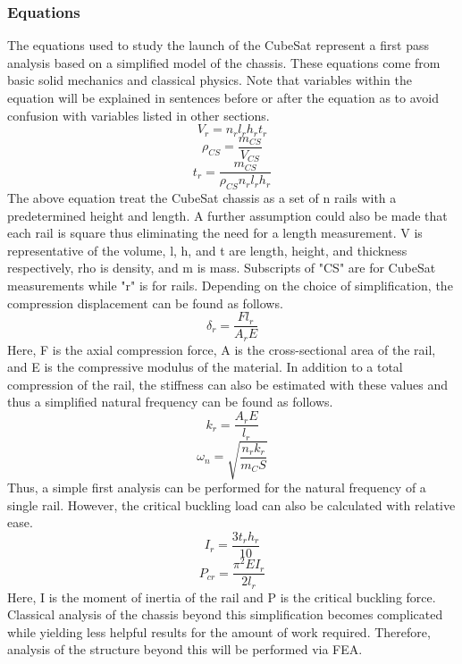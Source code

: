 \subsubsection{Equations}
The equations used to study the launch of the CubeSat represent a first pass analysis based on a simplified model of the chassis. These equations come from basic solid mechanics and classical physics. Note that variables within the equation will be explained in sentences before or after the equation as to avoid confusion with variables listed in other sections.
\begin{equation}
    \label{rail_V}
    V_r = n_rl_rh_rt_r
\end{equation}
\begin{equation}
    \label{CS_rho}
    \rho_{CS} =\frac{m_{CS}}{V_{CS}}
\end{equation}
\begin{equation}
    \label{rail_t}
    t_r = \frac{m_{CS}}{\rho_{CS}n_rl_rh_r}
\end{equation}
The above equation treat the CubeSat chassis as a set of n rails with a predetermined height and length. A further assumption could also be made that each rail is square thus eliminating the need for a length measurement. V is representative of the volume, l, h, and t are length, height, and thickness respectively, rho is density, and m is mass. Subscripts of "CS" are for CubeSat measurements while "r" is for rails. Depending on the choice of simplification, the compression displacement can be found as follows.
\begin{equation}
    \label{rail_I}
    \delta_r = \frac{Fl_r}{A_rE}
\end{equation}
Here, F is the axial compression force, A is the cross-sectional area of the rail, and E is the compressive modulus of the material. In addition to a total compression of the rail, the stiffness can also be estimated with these values and thus a simplified natural frequency can be found as follows.
\begin{equation}
    \label{rail_k}
    k_r = \frac{A_rE}{l_r}
\end{equation}
\begin{equation}
    \label{natf}
    \omega_n = \sqrt{\frac{n_rk_r}{m_CS}}
\end{equation}
Thus, a simple first analysis can be performed for the natural frequency of a single rail. However, the critical buckling load can also be calculated with relative ease.
\begin{equation}
    \label{I_r}
    I_r = \frac{3t_rh_r}{10}
\end{equation}
\begin{equation}
    \label{P_cr}
    P_{cr} = \frac{\pi^2EI_r}{2l_r}
\end{equation}
Here, I is the moment of inertia of the rail and P is the critical buckling force. Classical analysis of the chassis beyond this simplification becomes complicated while yielding less helpful results for the amount of work required. Therefore, analysis of the structure beyond this will be performed via FEA.
